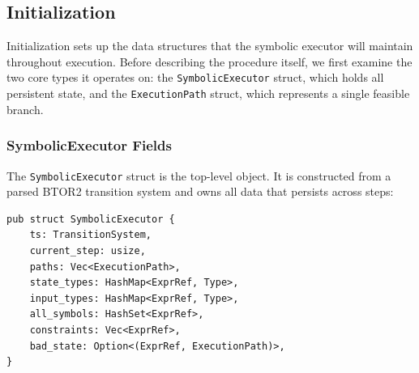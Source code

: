 \documentclass[11pt]{article}
\begin{document}
\subsection{Initialization}

Initialization sets up the data structures that the symbolic executor will maintain throughout execution. Before describing the procedure itself, we first examine the two core types it operates on: the \texttt{SymbolicExecutor} struct, which holds all persistent state, and the \texttt{ExecutionPath} struct, which represents a single feasible branch.

\subsubsection{SymbolicExecutor Fields}

The \texttt{SymbolicExecutor} struct is the top-level object. It is constructed from a parsed BTOR2 transition system and owns all data that persists across steps:

\begin{center}
\begin{verbatim}
pub struct SymbolicExecutor {
    ts: TransitionSystem,
    current_step: usize,
    paths: Vec<ExecutionPath>,
    state_types: HashMap<ExprRef, Type>,
    input_types: HashMap<ExprRef, Type>,
    all_symbols: HashSet<ExprRef>,
    constraints: Vec<ExprRef>,
    bad_state: Option<(ExprRef, ExecutionPath)>,
}
\end{verbatim}
\end{center}
\end{document}
